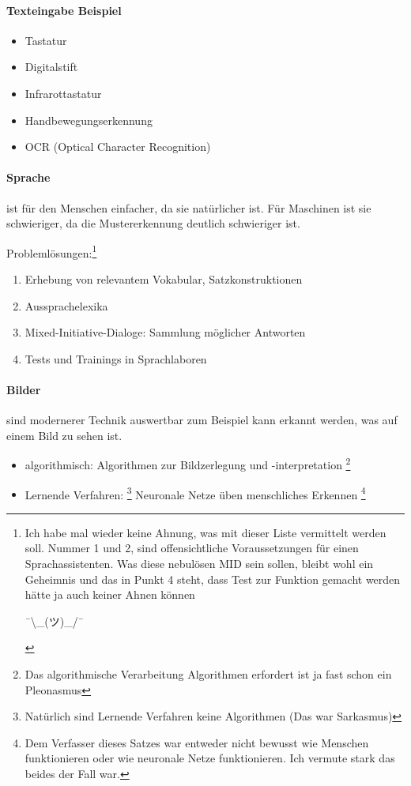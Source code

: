 \documentclass[twocolumn]{article}
\newcommand{\idk}{\begin{CJK}{UTF8}{ipxm} ¯\textbackslash \_(ツ)\_/¯ \end{CJK}}
\begin{document}
\paragraph{Texteingabe Beispiel}
\begin{itemize}
	\item Tastatur
	\item Digitalstift
	\item Infrarottastatur
	\item Handbewegungserkennung
	\item OCR (Optical Character Recognition)
\end{itemize}

\paragraph{Sprache}
ist für den Menschen einfacher, da sie natürlicher ist. Für Maschinen ist sie schwieriger, da die Mustererkennung deutlich schwieriger ist. 

Problemlösungen:\footnote{Ich habe mal wieder keine Ahnung, was mit dieser Liste vermittelt werden soll. Nummer 1 und 2, sind offensichtliche Voraussetzungen für einen Sprachassistenten. Was diese nebulösen MID sein sollen, bleibt wohl ein Geheimnis und das in Punkt 4 steht, dass Test zur Funktion gemacht werden hätte ja auch keiner Ahnen können \idk}
\begin{enumerate}
	\item Erhebung von relevantem Vokabular, Satzkonstruktionen
	\item Aussprachelexika
	\item Mixed-Initiative-Dialoge: Sammlung möglicher Antworten
	\item Tests und Trainings in Sprachlaboren
\end{enumerate}

\paragraph{Bilder} sind modernerer Technik auswertbar zum Beispiel kann erkannt werden, was auf einem Bild zu sehen ist.
\begin{itemize}
	\item algorithmisch: Algorithmen zur Bildzerlegung und -interpretation \footnote{Das algorithmische Verarbeitung Algorithmen erfordert ist ja fast schon ein Pleonasmus}
	\item Lernende Verfahren: \footnote{Natürlich sind Lernende Verfahren keine Algorithmen (Das war Sarkasmus)} Neuronale Netze üben menschliches Erkennen \footnote{Dem Verfasser dieses Satzes war entweder nicht bewusst wie Menschen funktionieren oder wie neuronale Netze funktionieren. Ich vermute stark das beides der Fall war.}
\end{itemize}
\end{document}
